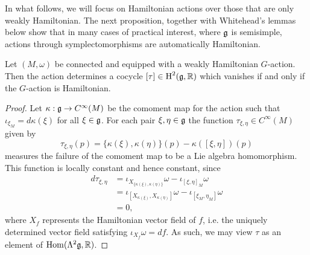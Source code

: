 \documentclass{amsart}
\begin{document}
In what follows, we will focus on Hamiltonian actions over those that are only weakly
Hamiltonian. The next proposition, together with Whitehead's lemmas below show that in
many cases of practical interest, where $\mathfrak g$ is semisimple, actions through symplectomorphisms
are automatically Hamiltonian.
\begin{proposition}
    Let $(M,\omega)$ be connected and equipped with a weakly Hamiltonian $G$-action.
    Then the action determines a cocycle $[\tau]\in\operatorname{H}^2(\mathfrak g,\mathbb{R})$ which vanishes
    if and only if the $G$-action is Hamiltonian.
\end{proposition}
\begin{proof}
    Let $\kappa:\mathfrak g\to C^\infty(M)$ be the comoment map for the action such that
    $\iota_{\xi_M}=d\kappa(\xi)$ for all $\xi\in\mathfrak g$. For each pair $\xi,\eta\in\mathfrak g$
    the function $\tau_{\xi,\eta}\in C^\infty(M)$ given by
    \begin{equation*}
        \tau_{\xi,\eta}(p) = \{\kappa(\xi),\kappa(\eta)\}(p)-\kappa([\xi,\eta])(p)
    \end{equation*}
    measures the failure of the comoment map to be a Lie algebra homomorphism.
    This function is locally constant and hence constant, since
    \begin{align*}
        d\tau_{\xi,\eta} &= \iota_{X_{\{\kappa(\xi),\kappa(\eta)\}}}\omega - \iota_{[\xi,\eta]_M}\omega\\
        &= \iota_{[X_{\kappa(\xi)},X_{\kappa(\eta)}]}\omega - \iota_{[\xi_M,\eta_M]}\omega\\
        &= 0,
    \end{align*}
    where $X_f$ represents the Hamiltonian vector field of $f$, i.e. the uniquely determined
    vector field satisfying $\iota_{X_f}\omega = df$. As such, we may view $\tau$ as
    an element of $\operatorname{Hom}(\Lambda^2\mathfrak g,\mathbb{R})$.


\end{proof}
\end{document}
